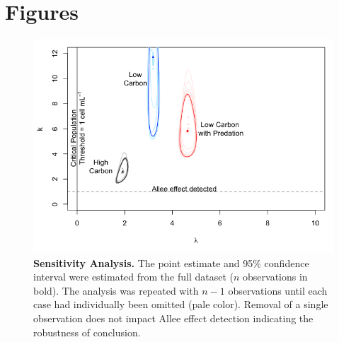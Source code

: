 \documentclass[a4paper,10pt]{article}
\begin{document}



\newpage
\renewcommand{\figurename}{Figure S}

\section{Figures}
\begin{figure}[!h]
\begin{center}
\includegraphics[width=\textwidth]{pointwise.png}
\end{center}
\caption{\textbf{Sensitivity Analysis.} The point estimate and 95\% confidence interval were estimated from the full dataset ($n$ observations in bold). The analysis was repeated with $n-1$ observations until each case had individually been omitted (pale color). Removal of a single observation does not impact Allee effect detection indicating the robustness of conclusion. }


\end{figure}
\end{document}

